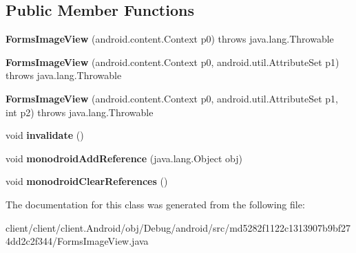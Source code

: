 \subsection*{Public Member Functions}
\begin{DoxyCompactItemize}
\item 
\hypertarget{classmd5282f1122c1313907b9bf274dd2c2f344_1_1FormsImageView_aaf5e4e97f14ba4b28f09a42169d3f99f}{}{\bfseries Forms\+Image\+View} (android.\+content.\+Context p0)  throws java.\+lang.\+Throwable 	\label{classmd5282f1122c1313907b9bf274dd2c2f344_1_1FormsImageView_aaf5e4e97f14ba4b28f09a42169d3f99f}

\item 
\hypertarget{classmd5282f1122c1313907b9bf274dd2c2f344_1_1FormsImageView_a0e03942faa7b268f88270398ebb1e58e}{}{\bfseries Forms\+Image\+View} (android.\+content.\+Context p0, android.\+util.\+Attribute\+Set p1)  throws java.\+lang.\+Throwable 	\label{classmd5282f1122c1313907b9bf274dd2c2f344_1_1FormsImageView_a0e03942faa7b268f88270398ebb1e58e}

\item 
\hypertarget{classmd5282f1122c1313907b9bf274dd2c2f344_1_1FormsImageView_a70403cddbd50db25a236ede9fffab845}{}{\bfseries Forms\+Image\+View} (android.\+content.\+Context p0, android.\+util.\+Attribute\+Set p1, int p2)  throws java.\+lang.\+Throwable 	\label{classmd5282f1122c1313907b9bf274dd2c2f344_1_1FormsImageView_a70403cddbd50db25a236ede9fffab845}

\item 
\hypertarget{classmd5282f1122c1313907b9bf274dd2c2f344_1_1FormsImageView_a576dcf04914a0b4f8c718c6cebae3220}{}void {\bfseries invalidate} ()\label{classmd5282f1122c1313907b9bf274dd2c2f344_1_1FormsImageView_a576dcf04914a0b4f8c718c6cebae3220}

\item 
\hypertarget{classmd5282f1122c1313907b9bf274dd2c2f344_1_1FormsImageView_ab0cc8d17f665858c1814a706ab7987fc}{}void {\bfseries monodroid\+Add\+Reference} (java.\+lang.\+Object obj)\label{classmd5282f1122c1313907b9bf274dd2c2f344_1_1FormsImageView_ab0cc8d17f665858c1814a706ab7987fc}

\item 
\hypertarget{classmd5282f1122c1313907b9bf274dd2c2f344_1_1FormsImageView_a42f85fef8956bd2029ab4b45bbfffe84}{}void {\bfseries monodroid\+Clear\+References} ()\label{classmd5282f1122c1313907b9bf274dd2c2f344_1_1FormsImageView_a42f85fef8956bd2029ab4b45bbfffe84}

\end{DoxyCompactItemize}


The documentation for this class was generated from the following file\+:\begin{DoxyCompactItemize}
\item 
client/client/client.\+Android/obj/\+Debug/android/src/md5282f1122c1313907b9bf274dd2c2f344/Forms\+Image\+View.\+java\end{DoxyCompactItemize}
